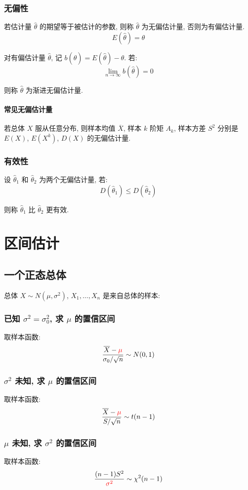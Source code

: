 \documentclass[UTF8]{ctexart}
\begin{document}
\subsubsection{无偏性}
若估计量 $ \hat \theta $ 的期望等于被估计的参数, 则称 $ \hat \theta $ 为无偏估计量, 否则为有偏估计量.
\[ E(\hat \theta) = \theta \]

对有偏估计量 $ \hat \theta $, 记 $ b(\hat \theta) = E(\hat\theta) - \theta $. 若:
\[ \lim_{n \to \infty} b(\hat \theta) = 0 \]

则称 $ \hat \theta $ 为渐进无偏估计量.

\paragraph{常见无偏估计量}
若总体 $ X $ 服从任意分布, 则样本均值 $ \overline X $, 样本 $ k $ 阶矩 $ A_k $, 样本方差 $ S^2 $ 分别是 $ E(X) $, $ E(X^k) $, $ D(X) $ 的无偏估计量.

\subsubsection{有效性}
设 $ \hat \theta_1 $ 和 $ \hat \theta_2 $ 为两个无偏估计量, 若:
\[ D(\hat \theta_1) \leqslant D(\hat \theta_2) \]

则称 $ \hat \theta_1 $ 比 $ \hat \theta_2 $ 更有效.


\section{区间估计}
\subsection{一个正态总体}
总体 $ X \sim N(\mu, \sigma^2) $, $ X_1, \dots, X_n $ 是来自总体的样本:
\subsubsection{已知 $ \sigma^2 = \sigma_0^2 $, 求 $ \mu $ 的置信区间}
取样本函数:
\[ \dfrac{\overline X - {\color{red} \mu}}{\sigma_0 / \sqrt n} \sim N(0, 1) \]

\subsubsection{$ \sigma^2 $ 未知, 求 $ \mu $ 的置信区间}
取样本函数:
\[ \dfrac{\overline X - {\color{red} \mu}}{S / \sqrt n} \sim t(n - 1) \]

\subsubsection{$ \mu $ 未知, 求 $ \sigma^2  $ 的置信区间}
取样本函数:
\[ \dfrac{(n - 1) S^2}{\color{red} \sigma^2} \sim \chi^2(n - 1) \]
\end{document}
